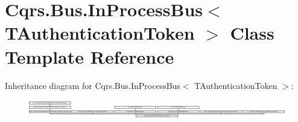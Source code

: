 \hypertarget{classCqrs_1_1Bus_1_1InProcessBus}{}\section{Cqrs.\+Bus.\+In\+Process\+Bus$<$ T\+Authentication\+Token $>$ Class Template Reference}
\label{classCqrs_1_1Bus_1_1InProcessBus}
Inheritance diagram for Cqrs.\+Bus.\+In\+Process\+Bus$<$ T\+Authentication\+Token $>$\+:\begin{figure}[H]
\begin{center}
\leavevmode
\includegraphics[height=0.850418cm]{classCqrs_1_1Bus_1_1InProcessBus}
\end{center}
\end{figure}
